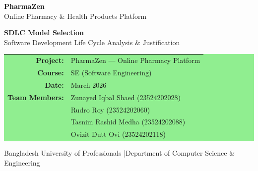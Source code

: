 \documentclass[12pt, a4paper]{article}
\begin{document}

\begin{titlepage}
  \centering
  \vspace*{2.5cm}
  {\fontsize{40}{48}\selectfont\color{pharmagreen}\textbf{PharmaZen}}\\[0.4cm]
  {\large\color{textgray} Online Pharmacy \& Health Products Platform}
  \vspace{1.4cm}

  \vspace{0.5cm}

  {\Large\color{darkgreen}\textbf{SDLC Model Selection}}\\[0.3cm]
  {\normalsize\color{textgray} Software Development Life Cycle Analysis \& Justification}
  \vspace{0.5cm}

  \vspace{1.6cm}

  \colorbox{lightgreen}{%
    \parbox{13cm}{%
      \vspace{12pt}\centering
      \renewcommand{\arraystretch}{1.7}
      \begin{tabular}{rl}
        \textbf{Project:}       & PharmaZen --- Online Pharmacy Platform \\
        \textbf{Course:}        & SE (Software Engineering) \\
        \textbf{Date:}          & March 2026 \\[4pt]
        \textbf{Team Members:}  & Zunayed Iqbal Shaed \quad\quad   (23524202028) \\
                                & Rudro Roy \quad\quad\quad\quad\quad\quad\;\;  (23524202060) \\
                                & Tasnim Rashid Medha \quad\quad (23524202088) \\
                                & Ovizit Dutt Ovi \quad\quad\quad\quad\quad (23524202118) \\
      \end{tabular}
      \vspace{12pt}
    }%
  }

  \vfill
  \vspace{0.4cm}
  {\small\color{textgray}Bangladesh University of Professionals \quad|\quad Department of Computer Science \& Engineering}
\end{titlepage}
\end{document}
